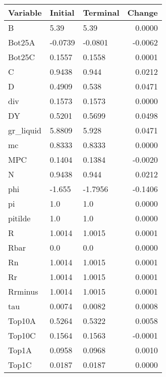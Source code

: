 \begin{table}
\centering
\label{tab:stst_comparison_end_L_limit_permanent_asymmetric}
\begin{tabular}{lllr}
\toprule
                Variable & Initial & Terminal &  Change \\
\midrule
                       B &    5.39 &     5.39 &  0.0000 \\
                  Bot25A & -0.0739 &  -0.0801 & -0.0062 \\
                  Bot25C &  0.1557 &   0.1558 &  0.0001 \\
                       C &  0.9438 &    0.944 &  0.0212 \\
                       D &  0.4909 &    0.538 &  0.0471 \\
                     div &  0.1573 &   0.1573 &  0.0000 \\
                      DY &  0.5201 &   0.5699 &  0.0498 \\
               gr\_liquid &  5.8809 &    5.928 &  0.0471 \\
                      mc &  0.8333 &   0.8333 &  0.0000 \\
                     MPC &  0.1404 &   0.1384 & -0.0020 \\
                       N &  0.9438 &    0.944 &  0.0212 \\
                     phi &  -1.655 &  -1.7956 & -0.1406 \\
                      pi &     1.0 &      1.0 &  0.0000 \\
                 pitilde &     1.0 &      1.0 &  0.0000 \\
                       R &  1.0014 &   1.0015 &  0.0001 \\
                    Rbar &     0.0 &      0.0 &  0.0000 \\
                      Rn &  1.0014 &   1.0015 &  0.0001 \\
                      Rr &  1.0014 &   1.0015 &  0.0001 \\
                 Rrminus &  1.0014 &   1.0015 &  0.0001 \\
                     tau &  0.0074 &   0.0082 &  0.0008 \\
                  Top10A &  0.5264 &   0.5322 &  0.0058 \\
                  Top10C &  0.1564 &   0.1563 & -0.0001 \\
                   Top1A &  0.0958 &   0.0968 &  0.0010 \\
                   Top1C &  0.0187 &   0.0187 &  0.0000 \\

\end{tabular}
\end{table}
